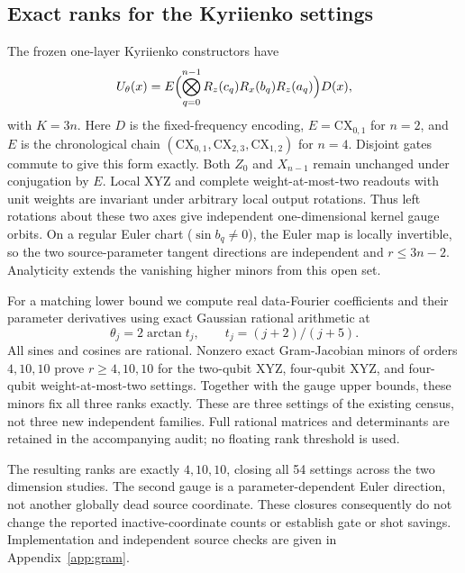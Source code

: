 \subsection{Exact ranks for the Kyriienko settings}
\label{sec:gramkyri}
The frozen one-layer Kyriienko constructors have
\begin{equation}
 U_\theta(x)=E\Bigl(\bigotimes_{q=0}^{n-1}
 R_z(c_q)R_x(b_q)R_z(a_q)\Bigr)D(x),\label{eq:kyriform}
\end{equation}
with $K=3n$. Here $D$ is the fixed-frequency encoding,
$E=\mathrm{CX}_{0,1}$ for $n=2$, and $E$ is the chronological
chain $(\mathrm{CX}_{0,1},\mathrm{CX}_{2,3},\mathrm{CX}_{1,2})$
for $n=4$. Disjoint gates commute to give this form exactly.
Both $Z_0$ and $X_{n-1}$ remain unchanged under conjugation by $E$.
Local XYZ and complete weight-at-most-two readouts with unit weights
are invariant under arbitrary local output rotations. Thus left
rotations about these two axes give independent one-dimensional
kernel gauge orbits. On a regular Euler chart ($\sin b_q\ne0$),
the Euler map is locally invertible, so the two source-parameter
tangent directions are independent and $r\le3n-2$.
Analyticity extends the vanishing higher minors from this open set.

For a matching lower bound we compute real data-Fourier coefficients
and their parameter derivatives using exact Gaussian rational
arithmetic at
\begin{equation}
 \theta_j=2\arctan t_j,\qquad t_j=(j+2)/(j+5).
\end{equation}
All sines and cosines are rational. Nonzero exact Gram-Jacobian minors
of orders $4,10,10$ prove $r\ge4,10,10$ for the two-qubit XYZ,
four-qubit XYZ, and four-qubit weight-at-most-two settings. Together
with the gauge upper bounds, these minors fix all three ranks exactly.
These are three settings of the existing census, not three new
independent families. Full rational matrices and determinants are
retained in the accompanying audit; no floating rank threshold is used.

The resulting ranks are exactly $4,10,10$, closing all 54 settings
across the two dimension studies. The second gauge is a
parameter-dependent Euler direction, not another globally dead
source coordinate. These closures consequently do not change the
reported inactive-coordinate counts or establish gate or shot savings.
Implementation and independent source checks are given in
Appendix~\ref{app:gram}.
